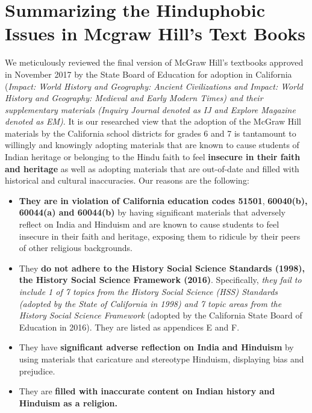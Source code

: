 \chapter{Summarizing the Hinduphobic Issues in Mcgraw Hill’s Text Books}

\rhead[]{\leftmark\quad\small\thepage}

We meticulously reviewed the final version of McGraw Hill’s textbooks approved in November 2017 by the State Board of Education for adoption in California (\textit{Impact: World History and Geography: Ancient Civilizations and Impact: World History and Geography: Medieval and Early Modern Times) and their supplementary materials (Inquiry Journal denoted as IJ and Explore Magazine denoted as EM)}. It is our researched view that the adoption of the McGraw Hill materials by the California school districts for grades 6 and 7 is tantamount to willingly and knowingly adopting materials that are known to cause students of Indian heritage or belonging to the Hindu faith to feel \textbf{insecure in their faith and heritage} as well as adopting materials that are out-of-date and filled with historical and cultural inaccuracies. Our reasons are the following:

\begin{itemize} 
\item \textbf{They are in violation of California education codes 51501}, \textbf{60040(b), 60044(a) and 60044(b)} by having significant materials that adversely reflect on India and Hinduism and are known to cause students to feel insecure in their faith and heritage, exposing them to ridicule by their peers of other religious backgrounds. 
\item They \textbf{do not adhere to the History Social Science Standards (1998), the History Social Science Framework (2016)}. Specifically, \textit{they fail to include 1 of 7 topics from the History Social Science (HSS) Standards (adopted by the State of California in 1998) and 7 topic areas from the History Social Science Framework} (adopted by the California State Board of Education in 2016). They are listed as appendices E and F. 
\item They have \textbf{significant adverse reflection on India and Hinduism} by using materials that caricature and stereotype Hinduism, displaying bias and prejudice.
\item They are \textbf{filled with inaccurate content on Indian history and Hinduism as a religion.} 
\end{itemize}

